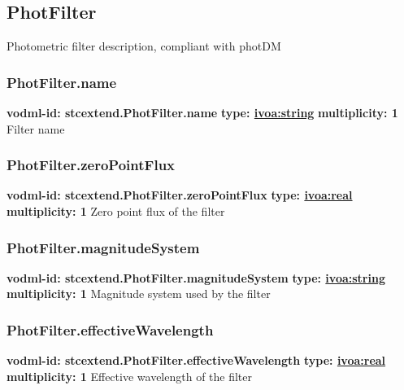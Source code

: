   \subsection{PhotFilter}
  \label{sect:stcextend.PhotFilter}
    Photometric filter description, compliant with photDM

    \subsubsection{PhotFilter.name}
      \textbf{vodml-id: stcextend.PhotFilter.name} \newline
      \textbf{type: \hyperref[sect:ivoa]{ivoa:string}} \newline
      \textbf{multiplicity: 1} \newline 
      Filter name

    \subsubsection{PhotFilter.zeroPointFlux}
      \textbf{vodml-id: stcextend.PhotFilter.zeroPointFlux} \newline
      \textbf{type: \hyperref[sect:ivoa]{ivoa:real}} \newline
      \textbf{multiplicity: 1} \newline 
      Zero point flux of the filter

    \subsubsection{PhotFilter.magnitudeSystem}
      \textbf{vodml-id: stcextend.PhotFilter.magnitudeSystem} \newline
      \textbf{type: \hyperref[sect:ivoa]{ivoa:string}} \newline
      \textbf{multiplicity: 1} \newline 
      Magnitude system used by the filter

    \subsubsection{PhotFilter.effectiveWavelength}
      \textbf{vodml-id: stcextend.PhotFilter.effectiveWavelength} \newline
      \textbf{type: \hyperref[sect:ivoa]{ivoa:real}} \newline
      \textbf{multiplicity: 1} \newline 
      Effective wavelength of the filter

